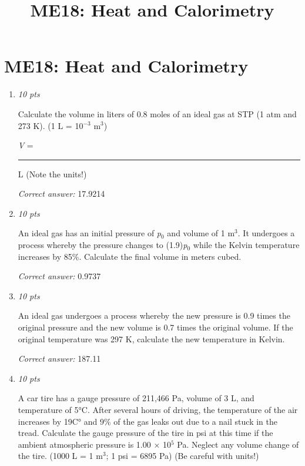 \documentclass[11pt]{article}
\title{ME18: Heat and Calorimetry}
\author{}
\date{}
\begin{document}
\maketitle

\section*{ME18: Heat and Calorimetry}

\begin{enumerate}[leftmargin=*,label=\textbf{Question \arabic*.}]

\item \hfill \textit{10 pts}

Calculate the volume in liters of 0.8 moles of an ideal gas at STP (1 atm and 273 K). (1 L = 10$^{-3}$ m$^{3}$)



\emph{V} = \rule{2.5cm}{0.4pt} L  (Note the units!)

\textit{Correct answer:} 17.9214

\item \hfill \textit{10 pts}

An ideal gas has an initial pressure of \emph{p}$_{0}$ and volume of  1 m$^{3}$. It undergoes a process whereby the pressure changes to  (1.9)\emph{p}$_{0}$ while the Kelvin temperature increases by 85\%. Calculate the final volume in meters cubed.

\textit{Correct answer:} 0.9737

\item \hfill \textit{10 pts}

An ideal gas undergoes a process whereby the new pressure is 0.9 times the original pressure and the new volume is 0.7 times the original volume. If the original temperature was 297 K, calculate the new temperature in Kelvin.

\textit{Correct answer:} 187.11

\item \hfill \textit{10 pts}

A car tire has a gauge pressure of 211,466 Pa, volume of 3 L, and temperature of 5°C. After several hours of driving, the temperature of the air increases by 19C° and 9\% of the gas leaks out due to a nail stuck in the tread. Calculate the gauge pressure of the tire in psi at this time if the ambient atmospheric pressure is 1.00 × 10$^{5}$ Pa. Neglect any volume change of the tire. (1000 L = 1 m$^{3}$; 1 psi = 6895 Pa)  (Be careful with units!)




\end{enumerate}
\end{document}
